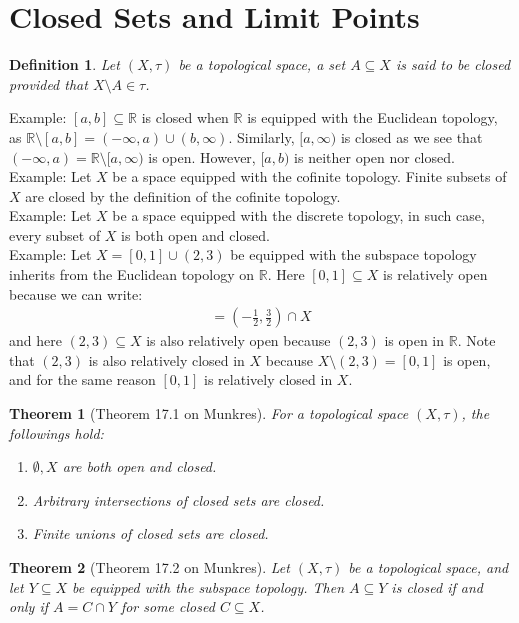 \documentclass[11pt]{book}
\theoremstyle{break}
\theoremstyle{break}
\newtheorem{thm}{Theorem}[section]
\newtheorem{defn}{Definition}[corL]
\newcommand{\R}{\mathbb{R}}
\newcommand{\example}{\color{green}Example: \color{black}}
\begin{document}
\newpage
\section[Closed Sets and Limit Points]{\color{red}Closed Sets and Limit Points\color{black}}
\begin{defn}
Let $(X,\tau)$ be a topological space, a set $A\subseteq X$ is said to be closed provided that $X\setminus A \in \tau$.
\end{defn}

\example $[a,b] \subseteq \R$ is closed when $\R$ is equipped with the Euclidean topology, as $\R\setminus [a,b] = (-\infty, a) \cup (b,\infty)$. Similarly, $[a,\infty)$ is closed as we see that $(-\infty, a) = \R \setminus [a,\infty)$ is open. However, $[a,b)$ is neither open nor closed. \\

\example Let $X$ be a space equipped with the cofinite topology. Finite subsets of $X$ are closed by the definition of the cofinite topology.\\

\example Let $X$ be a space equipped with the discrete topology, in such case, every subset of $X$ is both open and closed.\\

\example Let $X = [0,1]\cup (2,3)$ be equipped with the subspace topology inherits from the Euclidean topology on $\R$. Here $[0,1] \subseteq X$ is relatively open because we can write:
\begin{align*}
[0,1] = \left( -\frac{1}{2}, \frac{3}{2}\right) \cap X
\end{align*}
and here $(2,3) \subseteq X$ is also relatively open because $(2,3)$ is open in $\R$. Note that $(2,3)$ is also relatively closed in $X$ because $X\setminus (2,3) = [0,1]$ is open, and for the same reason $[0,1]$ is relatively closed in $X$.\\


\begin{thm}[Theorem 17.1 on Munkres]
For a topological space $(X,\tau)$, the followings hold:
\begin{enumerate}[topsep=3pt,itemsep=-1ex,partopsep=1ex,parsep=1ex]
\item $\emptyset,X$ are both open and closed.
\item Arbitrary intersections of closed sets are closed.
\item Finite unions of closed sets are closed. 
\end{enumerate}
\end{thm}
\begin{thm}[Theorem 17.2 on Munkres]
Let $(X,\tau)$ be a topological space, and let $Y \subseteq X$ be equipped with the subspace topology. Then $A\subseteq Y$ is closed if and only if $A = C\cap Y$ for some closed $C \subseteq X$. 
\end{thm}
\end{document}
